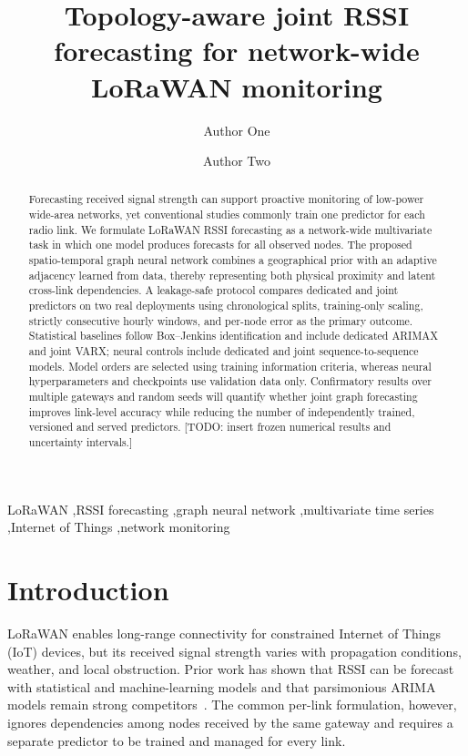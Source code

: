 \documentclass[preprint,12pt]{elsarticle}
\begin{document}
\begin{frontmatter}

\title{Topology-aware joint RSSI forecasting for network-wide LoRaWAN monitoring}

\author[inst1]{Author One}
\author[inst1]{Author Two}
\address[inst1]{Institution, city, country}

\begin{abstract}
Forecasting received signal strength can support proactive monitoring of low-power
wide-area networks, yet conventional studies commonly train one predictor for each
radio link. We formulate LoRaWAN RSSI forecasting as a network-wide multivariate task
in which one model produces forecasts for all observed nodes. The proposed
spatio-temporal graph neural network combines a geographical prior with an adaptive
adjacency learned from data, thereby representing both physical proximity and latent
cross-link dependencies. A leakage-safe protocol compares dedicated and joint
predictors on two real deployments using chronological splits, training-only scaling,
strictly consecutive hourly windows, and per-node error as the primary outcome.
Statistical baselines follow Box--Jenkins identification and include dedicated ARIMAX
and joint VARX; neural controls include dedicated and joint
sequence-to-sequence models. Model orders are selected using training information
criteria, whereas neural hyperparameters and checkpoints use validation data only.
Confirmatory results over multiple gateways and random seeds will quantify whether
joint graph forecasting improves link-level accuracy while reducing the number of
independently trained, versioned and served predictors. [TODO: insert frozen numerical
results and uncertainty intervals.]
\end{abstract}

\begin{keyword}
LoRaWAN \sep RSSI forecasting \sep graph neural network \sep multivariate time series
\sep Internet of Things \sep network monitoring
\end{keyword}
\end{frontmatter}

\section{Introduction}
LoRaWAN enables long-range connectivity for constrained Internet of Things (IoT)
devices, but its received signal strength varies with propagation conditions, weather,
and local obstruction. Prior work has shown that RSSI can be forecast with statistical
and machine-learning models and that parsimonious ARIMA models remain strong
competitors~\cite{guerra2024forecasting}. The common per-link formulation, however,
ignores dependencies among nodes received by the same gateway and requires a separate
predictor to be trained and managed for every link.
\end{document}
